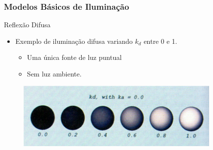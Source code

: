 \documentclass{beamer}
\begin{document}
\begin{frame}
\frametitle{Modelos Básicos de Iluminação}

	\begin{block}{Reflexão Difusa}
		\begin{itemize}
			\item Exemplo de iluminação difusa variando $k_d$ entre 0 e 1.
				\begin{itemize}
					\item Uma única fonte de luz puntual
					\item Sem luz ambiente.	
				\end{itemize}								 
		\end{itemize}
	\end{block}
	
	\begin{figure}[!h]
		\begin{center}
		\includegraphics[width=0.9\textwidth]{Figures/ExeIlu}
		\end{center}
	\end{figure}	
\end{frame}
\end{document}
